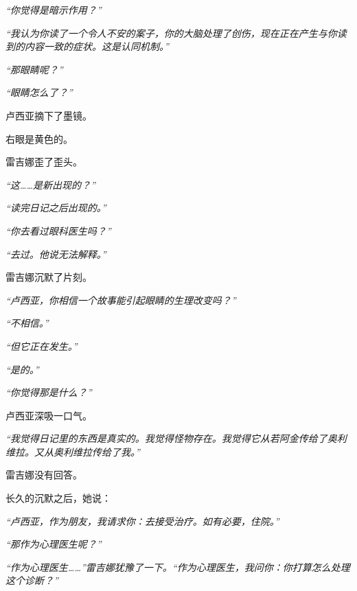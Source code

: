 \noindent \textit{\textquotedblleft{}你觉得是暗示作用？\textquotedblright{}}

\noindent \textit{\textquotedblleft{}我认为你读了一个令人不安的案子，你的大脑处理了创伤，现在正在产生与你读到的内容一致的症状。这是认同机制。\textquotedblright{}}

\noindent \textit{\textquotedblleft{}那眼睛呢？\textquotedblright{}}

\noindent \textit{\textquotedblleft{}眼睛怎么了？\textquotedblright{}}

\noindent 卢西亚摘下了墨镜。

\noindent 右眼是黄色的。

\noindent 雷吉娜歪了歪头。

\noindent \textit{\textquotedblleft{}这……是新出现的？\textquotedblright{}}

\noindent \textit{\textquotedblleft{}读完日记之后出现的。\textquotedblright{}}

\noindent \textit{\textquotedblleft{}你去看过眼科医生吗？\textquotedblright{}}

\noindent \textit{\textquotedblleft{}去过。他说无法解释。\textquotedblright{}}

\noindent 雷吉娜沉默了片刻。

\noindent \textit{\textquotedblleft{}卢西亚，你相信一个故事能引起眼睛的生理改变吗？\textquotedblright{}}

\noindent \textit{\textquotedblleft{}不相信。\textquotedblright{}}

\noindent \textit{\textquotedblleft{}但它正在发生。\textquotedblright{}}

\noindent \textit{\textquotedblleft{}是的。\textquotedblright{}}

\noindent \textit{\textquotedblleft{}你觉得那是什么？\textquotedblright{}}

\noindent 卢西亚深吸一口气。

\noindent \textit{\textquotedblleft{}我觉得日记里的东西是真实的。我觉得怪物存在。我觉得它从若阿金传给了奥利维拉。又从奥利维拉传给了我。\textquotedblright{}}

\noindent 雷吉娜没有回答。

\noindent 长久的沉默之后，她说：

\noindent \textit{\textquotedblleft{}卢西亚，作为朋友，我请求你：去接受治疗。如有必要，住院。\textquotedblright{}}

\noindent \textit{\textquotedblleft{}那作为心理医生呢？\textquotedblright{}}

\noindent \textit{\textquotedblleft{}作为心理医生……\textquotedblright{}雷吉娜犹豫了一下。\textquotedblleft{}作为心理医生，我问你：你打算怎么处理这个诊断？\textquotedblright{}}

